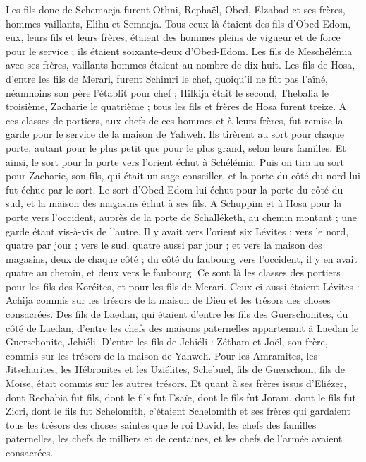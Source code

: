 \begin{multicols}{2}
Les fils donc de Schemaeja furent Othni, Rephaël, Obed, Elzabad et ses frères, hommes vaillants, Elihu et Semaeja.
Tous ceux-là étaient des fils d'Obed-Edom, eux, leurs fils et leurs frères, étaient des hommes pleins de vigueur et de force pour le service ; ils étaient soixante-deux d'Obed-Edom.
Les fils de Meschélémia avec ses frères, vaillants hommes étaient au nombre de dix-huit.
Les fils de Hosa, d'entre les fils de Merari, furent Schimri le chef, quoiqu'il ne fût pas l'aîné, néanmoins son père l'établit pour chef ;
Hilkija était le second, Thebalia le troisième, Zacharie le quatrième ; tous les fils et frères de Hosa furent treize.
A ces classes de portiers, aux chefs de ces hommes et à leurs frères, fut remise la garde pour le service de la maison de Yahweh.
Ils tirèrent au sort pour chaque porte, autant pour le plus petit que pour le plus grand, selon leurs familles.
Et ainsi, le sort pour la porte vers l'orient échut à Schélémia. Puis on tira au sort pour Zacharie, son fils, qui était un sage conseiller, et la porte du côté du nord lui fut échue par le sort.
Le sort d'Obed-Edom lui échut pour la porte du côté du sud, et la maison des magasins échut à ses fils.
A Schuppim et à Hosa pour la porte vers l'occident, auprès de la porte de Schalléketh, au chemin montant ; une garde étant vis-à-vis de l'autre.
Il y avait vers l'orient six Lévites ; vers le nord, quatre par jour ; vers le sud, quatre aussi par jour ; et vers la maison des magasins, deux de chaque côté ;
du côté du faubourg vers l'occident, il y en avait quatre au chemin, et deux vers le faubourg.
Ce sont là les classes des portiers pour les fils des Koréites, et pour les fils de Merari.
Ceux-ci aussi étaient Lévites : Achija commis sur les trésors de la maison de Dieu et les trésors des choses consacrées.
Des fils de Laedan, qui étaient d'entre les fils des Guerschonites, du côté de Laedan, d'entre les chefs des maisons paternelles appartenant à Laedan le Guerschonite, Jehiéli.
D'entre les fils de Jehiéli : Zétham et Joël, son frère, commis sur les trésors de la maison de Yahweh.
Pour les Amramites, les Jitseharites, les Hébronites et les Uziélites,
Schebuel, fils de Guerschom, fils de Moïse, était commis sur les autres trésors.
Et quant à ses frères issus d'Eliézer, dont Rechabia fut fils, dont le fils fut Esaïe, dont le fils fut Joram, dont le fils fut Zicri, dont le fils fut Schelomith,
c'étaient Schelomith et ses frères qui gardaient tous les trésors des choses saintes que le roi David, les chefs des familles paternelles, les chefs de milliers et de centaines, et les chefs de l'armée avaient consacrées.

\end{multicols}
